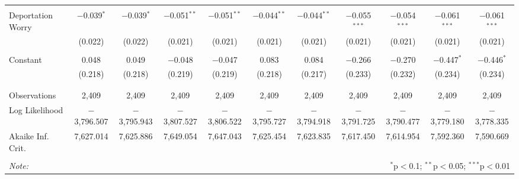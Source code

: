 \begin{table}[!htbp]
\begin{tabular}{@{\extracolsep{5pt}}lcccccccccc}
  & & & & & & & & & & \\ 
 Deportation Worry & $-$0.039$^{*}$ & $-$0.039$^{*}$ & $-$0.051$^{**}$ & $-$0.051$^{**}$ & $-$0.044$^{**}$ & $-$0.044$^{**}$ & $-$0.055$^{***}$ & $-$0.054$^{***}$ & $-$0.061$^{***}$ & $-$0.061$^{***}$ \\ 
  & (0.022) & (0.022) & (0.021) & (0.021) & (0.021) & (0.021) & (0.021) & (0.021) & (0.021) & (0.021) \\ 
  & & & & & & & & & & \\ 
 Constant & 0.048 & 0.049 & $-$0.048 & $-$0.047 & 0.083 & 0.084 & $-$0.266 & $-$0.270 & $-$0.447$^{*}$ & $-$0.446$^{*}$ \\ 
  & (0.218) & (0.218) & (0.219) & (0.219) & (0.218) & (0.217) & (0.233) & (0.232) & (0.234) & (0.234) \\ 
  & & & & & & & & & & \\ 
\hline \\[-1.8ex] 
Observations & 2,409 & 2,409 & 2,409 & 2,409 & 2,409 & 2,409 & 2,409 & 2,409 & 2,409 & 2,409 \\ 
Log Likelihood & $-$3,796.507 & $-$3,795.943 & $-$3,807.527 & $-$3,806.522 & $-$3,795.727 & $-$3,794.918 & $-$3,791.725 & $-$3,790.477 & $-$3,779.180 & $-$3,778.335 \\ 
Akaike Inf. Crit. & 7,627.014 & 7,625.886 & 7,649.054 & 7,647.043 & 7,625.454 & 7,623.835 & 7,617.450 & 7,614.954 & 7,592.360 & 7,590.669 \\ 
\hline 
\hline \\[-1.8ex] 
\textit{Note:}  & \multicolumn{10}{r}{$^{*}$p$<$0.1; $^{**}$p$<$0.05; $^{***}$p$<$0.01} \\ 
\end{tabular} 
\end{table} 
